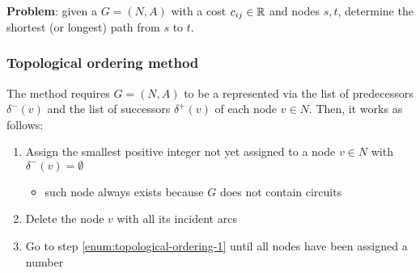 \documentclass[english]{article}
\begin{document}
\textbf{Problem}: given a \DAG \(G = (N, A)\) with a cost \(c_{ij} \in \mathbb{R}\) and nodes \(s, t\), determine the shortest (or longest) path from \(s\) to \(t\).

\subsubsection{Topological ordering method}

The method requires \(G = (N, A)\) to be a \DAG represented via the list of predecessors \(\delta^-(v)\) and the list of successors \(\delta^+(v)\) of each node \(v \in N\).
Then, it works as follows:

\begin{enumerate}[label=\arabic*., ref=(\arabic*)]
  \item\label{enum:topological-ordering-1} Assign the smallest positive integer not yet assigned to a node \(v \in N \) with \(\delta^-(v) = \emptyset\)
  \begin{itemize}[label=\(\rightarrow\)]
    \item such node always exists because \(G\) does not contain circuits
  \end{itemize}
  \item Delete the node \(v\) with all its incident arcs
  \item Go to step  \ref{enum:topological-ordering-1} until all nodes have been assigned a number
\end{enumerate}
\end{document}
